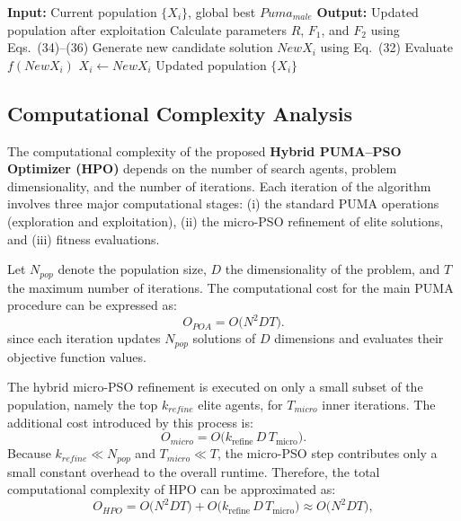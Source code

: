 \documentclass[a4paper,12pt]{article}
\begin{document}
\begin{algorithm}[h!]
\footnotesize
\caption{Pseudo-code of the Exploitation Phase of PUMA}
\label{alg:po_exploit}
\begin{algorithmic}[1]
\State \textbf{Input:} Current population $\{X_i\}$, global best $Puma_{male}$
\State \textbf{Output:} Updated population after exploitation
\vspace{0.2em}
    \State Calculate parameters $R$, $F_1$, and $F_2$ using Eqs.~(34)--(36)
    \State Generate new candidate solution $NewX_i$ using Eq.~(32)
    \State Evaluate $f(NewX_i)$
        \State $X_i \leftarrow NewX_i$
    \EndIf
\EndFor
\State \Return Updated population $\{X_i\}$
\end{algorithmic}
\end{algorithm}

\subsection{Computational Complexity Analysis}

The computational complexity of the proposed \textbf{Hybrid PUMA--PSO Optimizer (HPO)} depends on the number of search agents, problem dimensionality, and the number of iterations. Each iteration of the algorithm involves three major computational stages: (i) the standard PUMA operations (exploration and exploitation), (ii) the micro-PSO refinement of elite solutions, and (iii) fitness evaluations.

Let $N_{pop}$ denote the population size, $D$ the dimensionality of the problem, and $T$ the maximum number of iterations. The computational cost for the main PUMA procedure can be expressed as:
\begin{equation}
O_{POA} = O\big(N^2 D T\big).
\end{equation}
since each iteration updates $N_{pop}$ solutions of $D$ dimensions and evaluates their objective function values.

The hybrid micro-PSO refinement is executed on only a small subset of the population, namely the top $k_{refine}$ elite agents, for $T_{micro}$ inner iterations. The additional cost introduced by this process is:
\begin{equation}
O_{micro} = O\big(k_{\mathrm{refine}} \, D \, T_{\mathrm{micro}}\big).
\end{equation}
Because $k_{refine} \ll N_{pop}$ and $T_{micro} \ll T$, the micro-PSO step contributes only a small constant overhead to the overall runtime. Therefore, the total computational complexity of HPO can be approximated as:
\begin{equation}
O_{HPO} = O\big(N^2 D T\big) + O\big(k_{\mathrm{refine}} \, D \, T_{\mathrm{micro}}\big)
\approx O\big(N^2 D T\big),
\end{equation}
\end{document}
